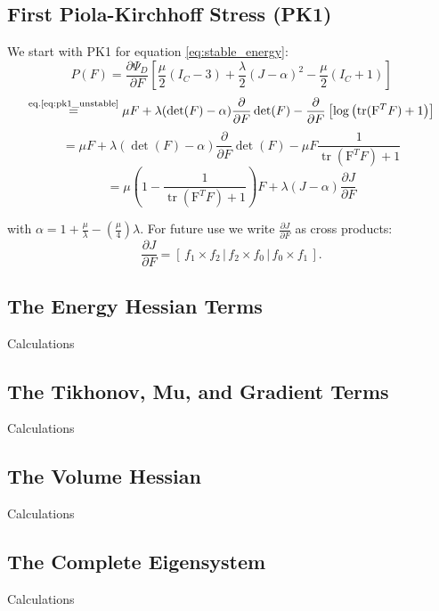 \subsection{First Piola-Kirchhoff Stress (PK1)}
We start with PK1 for equation \ref{eq:stable_energy}:
\[
P(F) = \frac{\partial \Psi_{D}}{\partial F} \left[ \frac{\mu}{2}\left(I_{C}-3\right) + \frac{\lambda}{2}(J-\alpha)^{2} - \frac{\mu}{2}\left(I_{C}+1\right) \right]
\]
\[
\stackrel{\text{eq.\ref{eq:pk1_unstable}}}{=} \mu F + \lambda (\operatorname{det}(F)-\alpha)  \frac{\partial}{\partial F} \operatorname{det}(F) - \frac{\partial}{\partial F} \left[\operatorname{log}\left(\operatorname{tr}(\mathrm{F}^{T}F)+1\right)\right]
\]
\[
= \mu F + \lambda (\operatorname{det}(F)-\alpha)  \frac{\partial}{\partial F} \operatorname{det}(F) - \mu F \frac{1}{\operatorname{tr}(\mathrm{F}^{T}F) + 1}
\]
\[
= \mu \left( 1 - \frac{1}{\operatorname{tr}(\mathrm{F}^{T}F) + 1}\right) F + \lambda(J-\alpha)\frac{\partial J}{\partial F}
\]

with $\alpha=1+\frac{\mu}{\lambda}-\left(\frac{\mu}{4}\right)\lambda$. For future use we write $\frac{\partial J}{\partial F}$ as cross products:
\[
\frac{\partial J}{\partial F} = \left[ \,f_1 \times f_2\, \bigg| \,f_2 \times f_0\, \bigg| \,f_0 \times f_1\, \right].
\]

\subsection{The Energy Hessian Terms}
Calculations

\subsection{The Tikhonov, Mu, and Gradient Terms}
Calculations

\subsection{The Volume Hessian}
Calculations
 
\subsection{The Complete Eigensystem}
Calculations




